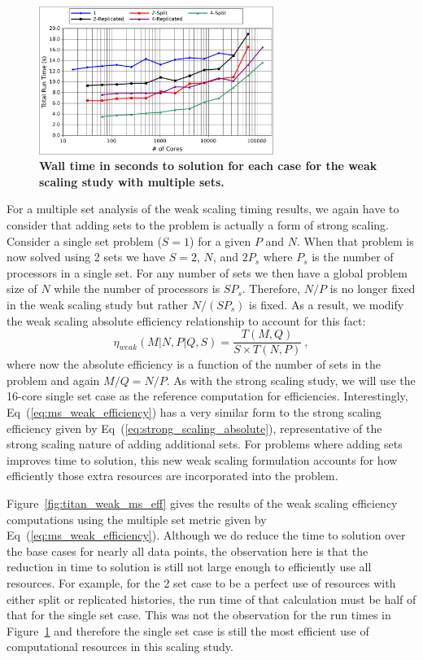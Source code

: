 \documentclass{snamc2013}
\begin{document}
\begin{figure}[h!]
  \begin{center}
    \includegraphics[width=3in]{titan_weak_ms_time.pdf}
  \end{center}
  \caption{\textbf{Wall time in seconds to solution for each case for
      the weak scaling study with multiple sets.}}
  \label{fig:titan_weak_ms_time}
\end{figure}

For a multiple set analysis of the weak scaling timing results, we
again have to consider that adding sets to the problem is actually a
form of strong scaling. Consider a single set problem ($S=1$) for a
given $P$ and $N$. When that problem is now solved using 2 sets we
have $S=2$, $N$, and $2P_s$ where $P_s$ is the number of processors in
a single set. For any number of sets we then have a global problem
size of $N$ while the number of processors is $SP_s$. Therefore,
$N/P$ is no longer fixed in the weak scaling study but rather
$N/(SP_s)$ is fixed. As a result, we modify the weak scaling absolute
efficiency relationship to account for this fact:
\begin{equation}
\eta_{weak}(M|N,P|Q,S) = \frac{T(M,Q)}{S \times T(N,P)}\:,
  \label{eq:ms_weak_efficiency}
\end{equation}
where now the absolute efficiency is a function of the number of sets
in the problem and again $M/Q = N/P$. As with the strong scaling
study, we will use the 16-core single set case as the reference
computation for efficiencies. Interestingly,
Eq~(\ref{eq:ms_weak_efficiency}) has a very similar form to the strong
scaling efficiency given by Eq~(\ref{eq:strong_scaling_absolute}),
representative of the strong scaling nature of adding additional
sets. For problems where adding sets improves time to solution, this
new weak scaling formulation accounts for how efficiently those extra
resources are incorporated into the problem.

Figure~\ref{fig:titan_weak_ms_eff} gives the results of the weak
scaling efficiency computations using the multiple set metric given by
Eq~(\ref{eq:ms_weak_efficiency}). Although we do reduce the time to
solution over the base cases for nearly all data points, the
observation here is that the reduction in time to solution is still
not large enough to efficiently use all resources. For example, for
the 2 set case to be a perfect use of resources with either split or
replicated histories, the run time of that calculation must be half of
that for the single set case. This was not the observation for the
run times in Figure~\ref{fig:titan_weak_ms_time} and therefore the
single set case is still the most efficient use of computational
resources in this scaling study.
\end{document}
